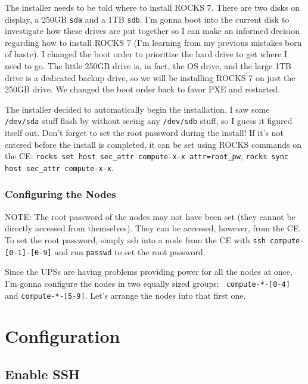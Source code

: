 \documentclass[12pt]{article}
\begin{document}
\qq The installer needs to be told where to install ROCKS 7. There are two disks
on display, a 250GB {\tt sda} and a 1TB {\tt sdb}. I'm gonna boot into the
current disk to investigate how these drives are put together so I can make an
informed decision regarding how to install ROCKS 7 (I'm learning from my
previous mistakes born of haste). I changed the boot order to prioritize the
hard drive to get where I need to go. The little 250GB drive is, in fact, the OS
drive, and the large 1TB drive is a dedicated backup drive, so we will be
installing ROCKS 7 on just the 250GB drive. We changed the boot order back to
favor PXE and restarted.

\qq The installer decided to automatically begin the installation. I saw some
{\tt /dev/sda} stuff flash by without seeing any {\tt /dev/sdb} stuff, so I
guess it figured itself out. Don't forget to set the root password during the
install! If it's not entered before the install is completed, it can be set
using ROCKS commands on the CE: {\tt rocks set host sec\_attr compute-x-x
  attr=root\_pw}, {\tt rocks sync host sec\_attr compute-x-x}.

\subsubsection{Configuring the Nodes}

\qq NOTE: The root password of the nodes may not have been set (they cannot be
directly accessed from themselves). They can be accessed, however, from the
CE. To set the root password, simply ssh into a node from the CE with {\tt ssh
  compute-[0-1]-[0-9]} and run {\tt passwd} to set the root password. 

\qq Since the UPSs are having problems providing power for all the nodes at
once, I'm gonna configure the nodes in two equally sized groups: {\tt
  compute-*-[0-4]} and {\tt compute-*-[5-9]}. Let's arrange the nodes into that
first one.



\section{Configuration}

\subsection{Enable SSH}
\end{document}
